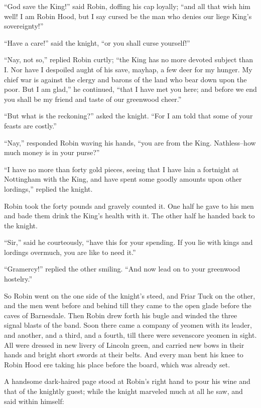 ``God save the King!'' said Robin, doffing his cap loyally; ``and all
that wish him well! I am Robin Hood, but I say cursed be the man who
denies our liege King's sovereignty!''

``Have a care!'' said the knight, ``or you shall curse yourself!''

``Nay, not so,'' replied Robin curtly; ``the King has no more devoted
subject than I. Nor have I despoiled aught of his save, mayhap, a few
deer for my hunger. My chief war is against the clergy and barons of the
land who bear down upon the poor. But I am glad,'' he continued, ``that
I have met you here; and before we end you shall be my friend and taste
of our greenwood cheer.''

``But what is the reckoning?'' asked the knight. ``For I am told that
some of your feasts are costly.''

``Nay,'' responded Robin waving his hands, ``you are from the King.
Nathless--how much money is in your purse?''

``I have no more than forty gold pieces, seeing that I have lain a
fortnight at Nottingham with the King, and have spent some goodly
amounts upon other lordings,'' replied the knight.

Robin took the forty pounds and gravely counted it. One half he gave to
his men and bade them drink the King's health with it. The other half he
handed back to the knight.

``Sir,'' said he courteously, ``have this for your spending. If you lie
with kings and lordings overmuch, you are like to need it.''

``Gramercy!'' replied the other smiling. ``And now lead on to your
greenwood hostelry.''

So Robin went on the one side of the knight's steed, and Friar Tuck on
the other, and the men went before and behind till they came to the open
glade before the caves of Barnesdale. Then Robin drew forth his bugle
and winded the three signal blasts of the band. Soon there came a
company of yeomen with its leader, and another, and a third, and a
fourth, till there were sevenscore yeomen in sight. All were dressed in
new livery of Lincoln green, and carried new bows in their hands and
bright short swords at their belts. And every man bent his knee to Robin
Hood ere taking his place before the board, which was already set.

A handsome dark-haired page stood at Robin's right hand to pour his wine
and that of the knightly guest; while the knight marveled much at all he
saw, and said within himself:

